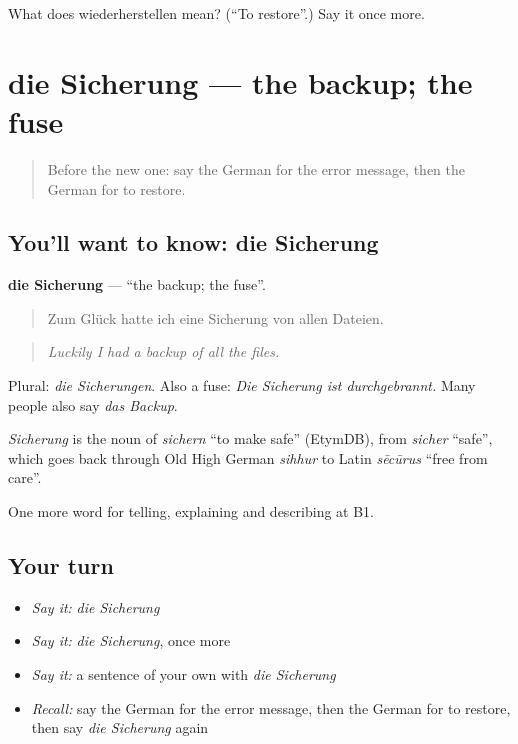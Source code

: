 \begin{tcolorbox}[breakable,colback=teal!4,colframe=teal!35!black,title={Before you move on}]
What does wiederherstellen mean? (\textquotedblleft{}To restore\textquotedblright{}.) Say it once more.
\end{tcolorbox}
\section[die Sicherung]{die Sicherung — the backup; the fuse}

\label{lesson:GE-C397-sicherung}



\begin{quote}
Before the new one: say the German for the error message, then the German for to restore.
\end{quote}

\subsection*{You'll want to know: die Sicherung}
\textbf{die Sicherung} — \textquotedblleft{}the backup; the fuse\textquotedblright{}.

\begin{quote}
Zum Glück hatte ich eine Sicherung von allen Dateien.
\end{quote}

\begin{quote}
\emph{Luckily I had a backup of all the files.}
\end{quote}

Plural: \emph{die Sicherungen}. Also a fuse: \emph{Die Sicherung ist durchgebrannt.} Many people also say \emph{das Backup}.

\begin{cousinweb}
\emph{Sicherung} is the noun of \emph{sichern} \textquotedblleft{}to make safe\textquotedblright{} (EtymDB), from \emph{sicher} \textquotedblleft{}safe\textquotedblright{}, which goes back through Old High German \emph{sihhur} to Latin \emph{sēcūrus} \textquotedblleft{}free from care\textquotedblright{}.
\end{cousinweb}

\begin{grammarlens}[title={What you've built}]
One more word for telling, explaining and describing at B1.
\end{grammarlens}

\subsection*{Your turn}
\begin{itemize}
\raggedright
  \item \emph{Say it:} \emph{die Sicherung}
  \item \emph{Say it:} \emph{die Sicherung}, once more
  \item \emph{Say it:} a sentence of your own with \emph{die Sicherung}
  \item \emph{Recall:} say the German for the error message, then the German for to restore, then say \emph{die Sicherung} again
\end{itemize}

